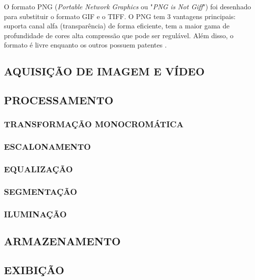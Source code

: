O formato PNG (\textit{Portable Network Graphics} ou "\textit{PNG is Not Giff}")  foi desenhado para substituir o formato GIF e o TIFF. O PNG tem 3 vantagens principais: suporta canal alfa (transparência) de forma eficiente, tem a maior gama de profundidade de cores alta compressão que pode ser regulável. Além disso, o formato é livre enquanto os outros possuem patentes \cite{png}. 


\subsection{AQUISIÇÃO DE IMAGEM E VÍDEO}\label{subsec:aquisicao_video}

\subsection{PROCESSAMENTO}\label{subsec:processamento}

\subsubsection{TRANSFORMAÇÃO MONOCROMÁTICA}\label{subsubsec:filtros}

\subsubsection{ESCALONAMENTO}\label{subsubsec:escalonamento}

\subsubsection{EQUALIZAÇÃO}\label{subsubsec:equalizacao}

\subsubsection{SEGMENTAÇÃO}\label{subsubsec:segmentacao}

\subsubsection{ILUMINAÇÃO}\label{subsubsec:iluminacao}

\subsection{ARMAZENAMENTO}\label{subsubsec:armazenamento}

\subsection{EXIBIÇÃO}\label{subsubsec:exibicao}


